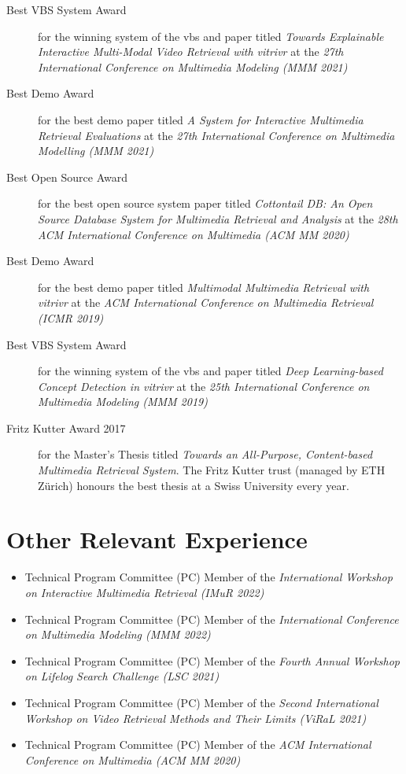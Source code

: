 \begin{description}
	\item [Best VBS System Award] for the winning system of the \acrshort{vbs} and paper titled \emph{Towards Explainable Interactive Multi-Modal Video Retrieval with vitrivr} at the \emph{27th International Conference on Multimedia Modeling (MMM 2021)}
	\item [Best Demo Award] for the best demo paper titled \emph{A System for Interactive Multimedia Retrieval Evaluations} at the \emph{27th International Conference on Multimedia Modelling (MMM 2021)}
	\item [Best Open Source Award] for the best open source system paper titled \emph{Cottontail DB: An Open Source Database System for Multimedia Retrieval and Analysis} at the \emph{28th ACM International Conference on Multimedia (ACM MM 2020)}
	\item [Best Demo Award] for the best demo paper titled \emph{Multimodal Multimedia Retrieval with vitrivr} at the \emph{ACM International Conference on Multimedia Retrieval (ICMR 2019)}
	\item [Best VBS System Award] for the winning system of the \acrshort{vbs} and paper titled \emph{Deep Learning-based Concept Detection in vitrivr} at the \emph{25th International Conference on Multimedia Modeling (MMM 2019)}
	\item [Fritz Kutter Award 2017] for the Master's Thesis titled \emph{Towards an All-Purpose, Content-based Multimedia Retrieval System}. The Fritz Kutter trust (managed by ETH Zürich) honours the best thesis at a Swiss University every year.
\end{description}

\section*{Other Relevant Experience}

\begin{itemize}
	\item Technical Program Committee (PC) Member of the \emph{International Workshop on Interactive Multimedia Retrieval (IMuR	
	2022)} 
	\item Technical Program Committee (PC) Member of the \emph{International Conference on Multimedia Modeling (MMM 2022)} 
	\item Technical Program Committee (PC) Member of the \emph{Fourth Annual Workshop on Lifelog Search Challenge (LSC 2021)} 
	\item Technical Program Committee (PC) Member of the \emph{Second International Workshop on Video Retrieval Methods and Their Limits (ViRaL 2021)}
	\item Technical Program Committee (PC) Member of the \emph{ACM International Conference on Multimedia (ACM MM 2020)} 
\end{itemize}

\cleardoublepage
